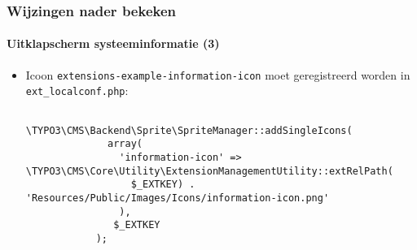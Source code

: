 \begin{frame}[fragile]
	\frametitle{Wijzingen nader bekeken}
	\framesubtitle{Uitklapscherm systeeminformatie (3)}

	\lstset{basicstyle=\tiny\ttfamily}

	\begin{itemize}
		\item Icoon \texttt{extensions-example-information-icon} moet geregistreerd worden in \texttt{ext\_localconf.php}:
		\begin{lstlisting}
			\TYPO3\CMS\Backend\Sprite\SpriteManager::addSingleIcons(
			  array(
			    'information-icon' => \TYPO3\CMS\Core\Utility\ExtensionManagementUtility::extRelPath(
			      $_EXTKEY) . 'Resources/Public/Images/Icons/information-icon.png'
			    ),
			   $_EXTKEY
			);
		\end{lstlisting}

	\end{itemize}

\end{frame}


